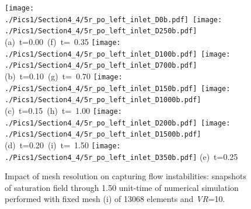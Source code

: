   \begin{figure}[ht]
  \vbox{\vspace{-1.cm}
      \hbox{\texttt{[image: ./Pics1/Section4\_4/5r\_po\_left\_inlet\_D0b.pdf]}
            \texttt{[image: ./Pics1/Section4\_4/5r\_po\_left\_inlet\_D250b.pdf]}} 
      \vspace{-.1cm}\hbox{\hspace{2.cm}(a) t=0.00 \hspace{4cm} (f) t= 0.35}\vspace{-.1cm}
      \hbox{\texttt{[image: ./Pics1/Section4\_4/5r\_po\_left\_inlet\_D100b.pdf]} 
            \texttt{[image: ./Pics1/Section4\_4/5r\_po\_left\_inlet\_D700b.pdf]}}
      \vspace{-.1cm}\hbox{\hspace{2.cm}(b) t=0.10 \hspace{4cm} (g) t= 0.70}\vspace{-.1cm}
      \hbox{\texttt{[image: ./Pics1/Section4\_4/5r\_po\_left\_inlet\_D150b.pdf]} 
            \texttt{[image: ./Pics1/Section4\_4/5r\_po\_left\_inlet\_D1000b.pdf]}}
      \vspace{-.1cm}\hbox{\hspace{2.cm}(c) t=0.15 \hspace{4cm} (h) t= 1.00}\vspace{-.1cm}
      \hbox{\texttt{[image: ./Pics1/Section4\_4/5r\_po\_left\_inlet\_D200b.pdf]} 
            \texttt{[image: ./Pics1/Section4\_4/5r\_po\_left\_inlet\_D1500b.pdf]}}
      \vspace{-.1cm}\hbox{\hspace{2.cm}(d) t=0.20 \hspace{4cm} (i) t= 1.50}\vspace{-.1cm}
      \hbox{\texttt{[image: ./Pics1/Section4\_4/5r\_po\_left\_inlet\_D350b.pdf]}}
      \vspace{-.1cm}\hbox{\hspace{2.cm}(e) t=0.25}\vspace{-.1cm}}
\caption{Impact of mesh resolution on capturing flow instabilities: snapshots of saturation field through 1.50 unit-time of numerical simulation performed with fixed mesh (i) of 13068 elements and {\it VR}=10.}
\label{fig:5regions_fixedmesh}
\end{figure}
\clearpage



